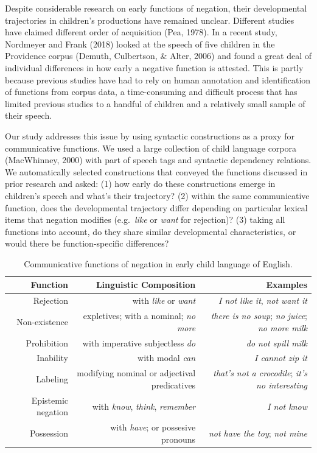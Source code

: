 \documentclass[
  english,
  man,floatsintext]{apa6}
\begin{document}
Despite considerable research on early functions of negation, their developmental trajectories in children's productions have remained unclear. Different studies have claimed different order of acquisition (Pea, 1978). In a recent study, Nordmeyer and Frank (2018) looked at the speech of five children in the Providence corpus (Demuth, Culbertson, \& Alter, 2006) and found a great deal of individual differences in how early a negative function is attested. This is partly because previous studies have had to rely on human annotation and identification of functions from corpus data, a time-consuming and difficult process that has limited previous studies to a handful of children and a relatively small sample of their speech.

Our study addresses this issue by using syntactic constructions as a proxy for communicative functions. We used a large collection of child language corpora (MacWhinney, 2000) with part of speech tags and syntactic dependency relations. We automatically selected constructions that conveyed the functions discussed in prior research and asked: (1) how early do these constructions emerge in children's speech and what's their trajectory? (2) within the same communicative function, does the developmental trajectory differ depending on particular lexical items that negation modifies (e.g.~\emph{like} or \emph{want} for rejection)? (3) taking all functions into account, do they share similar developmental characteristics, or would there be function-specific differences?

\begin{table}[h!]
\small
\centering
\begin{tabular}{rrr}
  \hline
 \textbf{Function} & \textbf{Linguistic Composition} & \textbf{Examples} \\
  \hline
Rejection & with \textit{like} or \textit{want} & \textit{I not like it}, \textit{not want it}  \\
Non-existence & expletives; with a nominal; \textit{no more} & \textit{there is no soup}; \textit{no juice}; \textit{no more milk} \\
Prohibition & with imperative subjectless \textit{do} & \textit{do not spill milk} \\
Inability & with modal \textit{can} & \textit{I cannot zip it} \\
Labeling & modifying nominal or adjectival predicatives & \textit{that's not a crocodile}; \textit{it's no interesting} \\
Epistemic negation & with \textit{know}, \textit{think}, \textit{remember}  & \textit{I not know} \\
Possession & with \textit{have}; or possesive pronouns & \textit{not have the toy}; \textit{not mine} \\
   \hline
\end{tabular}
\caption{Communicative functions of negation in early child language of English.}
\end{table}
\end{document}
